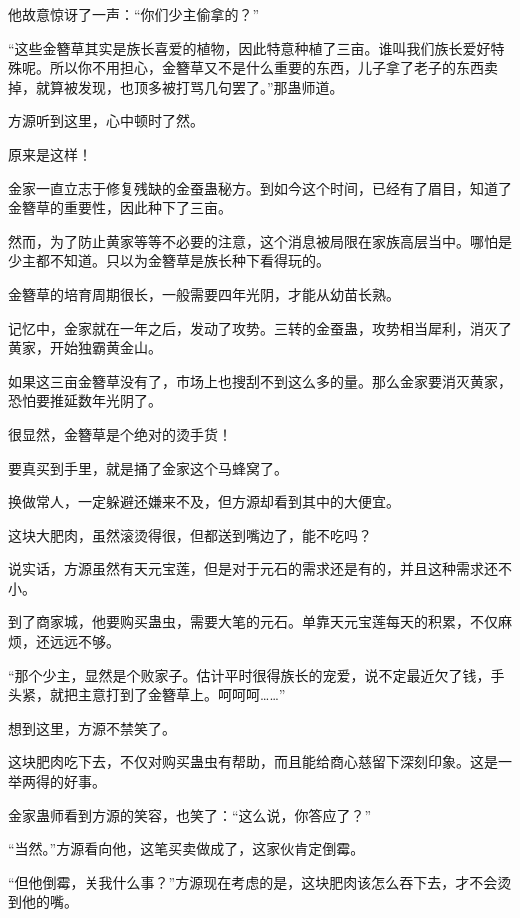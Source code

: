 \begin{this_body}
他故意惊讶了一声：“你们少主偷拿的？”

“这些金簪草其实是族长喜爱的植物，因此特意种植了三亩。谁叫我们族长爱好特殊呢。所以你不用担心，金簪草又不是什么重要的东西，儿子拿了老子的东西卖掉，就算被发现，也顶多被打骂几句罢了。”那蛊师道。

方源听到这里，心中顿时了然。

原来是这样！

金家一直立志于修复残缺的金蚕蛊秘方。到如今这个时间，已经有了眉目，知道了金簪草的重要性，因此种下了三亩。

然而，为了防止黄家等等不必要的注意，这个消息被局限在家族高层当中。哪怕是少主都不知道。只以为金簪草是族长种下看得玩的。

金簪草的培育周期很长，一般需要四年光阴，才能从幼苗长熟。

记忆中，金家就在一年之后，发动了攻势。三转的金蚕蛊，攻势相当犀利，消灭了黄家，开始独霸黄金山。

如果这三亩金簪草没有了，市场上也搜刮不到这么多的量。那么金家要消灭黄家，恐怕要推延数年光阴了。

很显然，金簪草是个绝对的烫手货！

要真买到手里，就是捅了金家这个马蜂窝了。

换做常人，一定躲避还嫌来不及，但方源却看到其中的大便宜。

这块大肥肉，虽然滚烫得很，但都送到嘴边了，能不吃吗？

说实话，方源虽然有天元宝莲，但是对于元石的需求还是有的，并且这种需求还不小。

到了商家城，他要购买蛊虫，需要大笔的元石。单靠天元宝莲每天的积累，不仅麻烦，还远远不够。

“那个少主，显然是个败家子。估计平时很得族长的宠爱，说不定最近欠了钱，手头紧，就把主意打到了金簪草上。呵呵呵……”

想到这里，方源不禁笑了。

这块肥肉吃下去，不仅对购买蛊虫有帮助，而且能给商心慈留下深刻印象。这是一举两得的好事。

金家蛊师看到方源的笑容，也笑了：“这么说，你答应了？”

“当然。”方源看向他，这笔买卖做成了，这家伙肯定倒霉。

“但他倒霉，关我什么事？”方源现在考虑的是，这块肥肉该怎么吞下去，才不会烫到他的嘴。

\end{this_body}

